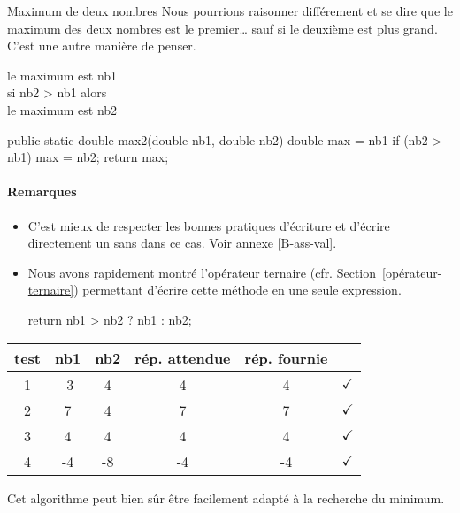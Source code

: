 \begin{Fiche}{Maximum de deux nombres}
	Nous pourrions raisonner différement et se dire que le maximum des deux
	nombres est le premier… sauf si le deuxième est plus grand. C'est une autre
	manière de penser. 

	\begin{langagenaturel}
		le maximum est nb1\\
		si nb2 > nb1 alors\\
			\tab le maximum est nb2\\
	\end{langagenaturel}
	
	\begin{java}
public static double max2(double nb1, double nb2){
	double max = nb1
	if (nb2 > nb1){
		max = nb2;
	} 
	return max;
}
	\end{java}
	
	\paragraph{Remarques} 
	
	\begin{itemize}
	
		\item C'est mieux de respecter les bonnes pratiques d'écriture et
			d'écrire directement un  sans  dans ce cas.  Voir
			annexe \vref{B-ass-val}.


		\item Nous avons rapidement montré l'opérateur ternaire (cfr.
			Section~\vref{opérateur-ternaire}) permettant d'écrire cette
			méthode en une seule expression.

			\begin{java}
	return nb1 > nb2 ? nb1 : nb2;
			\end{java}
	
	\end{itemize}



	\begin{center}
		\begin{tabular}{|c|cccc|c|}
		\hline
			\rowcolor{black!40}
		test \no & nb1 & nb2 &  rép. attendue & rép. fournie & {} \\
		\hline 
		1 & -3 & 4   & 4   & 4 & {\color{ForestGreen}$\checkmark$} \\\hline
		2 & 7 & 4   & 7   & 7 & {\color{ForestGreen}$\checkmark$} \\\hline
		3 & 4 & 4   & 4   & 4 & {\color{ForestGreen}$\checkmark$} \\\hline
		4 & -4 & -8   & -4   & -4 & {\color{ForestGreen}$\checkmark$} \\\hline
		\end{tabular}
	\end{center}								

	

	Cet algorithme peut bien sûr être facilement adapté à la recherche du
	minimum.
		
\end{Fiche}
